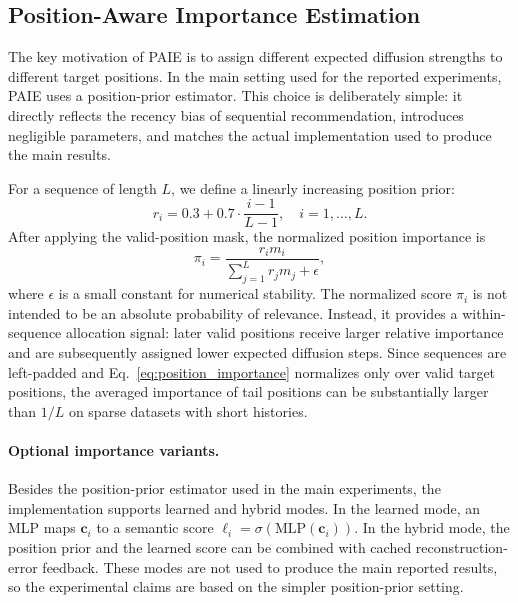 \documentclass[runningheads,a4paper]{llncs}
\begin{document}
\subsection{Position-Aware Importance Estimation}
\label{subsec:paie}

The key motivation of PAIE is to assign different expected diffusion strengths to different target positions. In the main setting used for the reported experiments, PAIE uses a position-prior estimator. This choice is deliberately simple: it directly reflects the recency bias of sequential recommendation, introduces negligible parameters, and matches the actual implementation used to produce the main results.

For a sequence of length $L$, we define a linearly increasing position prior:
\begin{equation}
    r_i=0.3+0.7\cdot\frac{i-1}{L-1},\quad i=1,\ldots,L.
    \label{eq:position_prior}
\end{equation}
After applying the valid-position mask, the normalized position importance is
\begin{equation}
    \pi_i=\frac{r_i m_i}{\sum_{j=1}^{L} r_jm_j+\epsilon},
    \label{eq:position_importance}
\end{equation}
where $\epsilon$ is a small constant for numerical stability. The normalized score $\pi_i$ is not intended to be an absolute probability of relevance. Instead, it provides a within-sequence allocation signal: later valid positions receive larger relative importance and are subsequently assigned lower expected diffusion steps. Since sequences are left-padded and Eq.~\eqref{eq:position_importance} normalizes only over valid target positions, the averaged importance of tail positions can be substantially larger than $1/L$ on sparse datasets with short histories.

\paragraph{Optional importance variants.}
Besides the position-prior estimator used in the main experiments, the implementation supports learned and hybrid modes. In the learned mode, an MLP maps $\mathbf{c}_i$ to a semantic score $\ell_i=\sigma(\mathrm{MLP}(\mathbf{c}_i))$. In the hybrid mode, the position prior and the learned score can be combined with cached reconstruction-error feedback. These modes are not used to produce the main reported results, so the experimental claims are based on the simpler position-prior setting.
\end{document}
